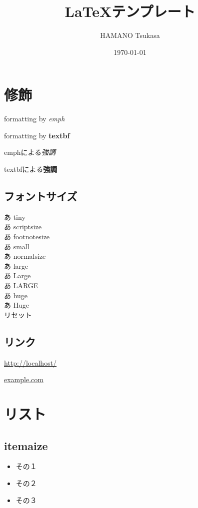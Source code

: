 \documentclass[a4paper,onecolumn,12pt]{jsarticle}
\title{\LaTeX テンプレート}
\author{HAMANO Tsukasa}
\date{\today}
\begin{document}
\maketitle
\vspace{1em}
\tableofcontents
\clearpage

\section{修飾}

formatting by \emph{emph}

formatting by \textbf{textbf}

emphによる\emph{強調}

textbfによる\textbf{強調}

\subsection{フォントサイズ}

\tiny{あ tiny}\\
\scriptsize{あ scriptsize}\\
\footnotesize{あ footnotesize}\\
\small{あ small}\\
\normalsize{あ normalsize}\\
\large{あ large}\\
\Large{あ Large}\\
\LARGE{あ LARGE}\\
\huge{あ huge}\\
\Huge{あ Huge}\\
\normalsize{リセット}\\

\subsection{リンク}
\url{http://localhost/}

\href{http://www.example.com/}{example.com}

\section{リスト}

\subsection{itemaize}
\begin{itemize}
\item その１
\item その２
\item その３
\end{itemize}
\end{document}
